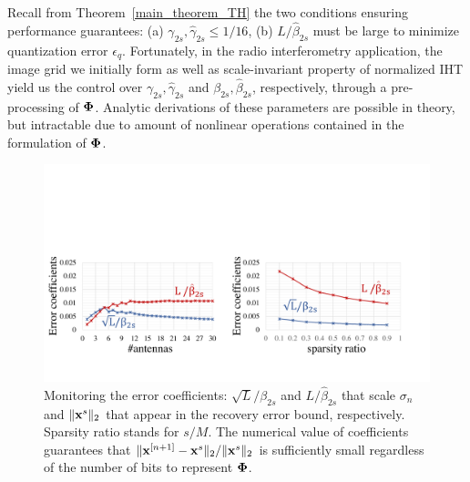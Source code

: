 \documentclass[aoas,preprint]{imsart}
\numberwithin{equation}{section}
\theoremstyle{plain}
\begin{document}
 Recall from Theorem~\ref{main_theorem_TH} the two conditions ensuring  performance guarantees: (a) $\gamma_{2s}, \hat{\gamma}_{2s} \leq 1/16$, (b) ${L}/{\hat{\beta}_{2s}}$ must be large to minimize quantization error $ {\epsilon}_q$. Fortunately, in the radio interferometry application, the image grid we initially form as well as scale-invariant property of normalized IHT yield us the control over $\gamma_{2s}, \hat{\gamma}_{2s}$ and ${\beta}_{2s}, \hat{\beta}_{2s}$, respectively, through a pre-processing of ${\bf \Phi}$. Analytic derivations of these parameters are possible in theory, but intractable due to amount of nonlinear operations contained in the formulation of ${\bf \Phi}$. 
\begin{figure}[t!]
\centering
\includegraphics[width=1\columnwidth, angle=0]{figs/beta.pdf}
\caption{Monitoring the error coefficients: $\sqrt{L}/\beta_{2s}$ and $L/\hat{\beta}_{2s}$ that scale $ \sigma_n$ and $\|{\bf x}^s \|_2$ that appear in the recovery error bound, respectively. Sparsity ratio stands for $s/M$. The numerical value of coefficients guarantees that $\|{\bf x}^{[n+1]}-{\bf x}^s\|_2/\|{\bf x}^s \|_2$ is sufficiently small regardless of the number of bits to represent ${\bf \Phi}$.}
\label{fig:beta}
\end{figure}
\vspace{0.5em}
\end{document}
